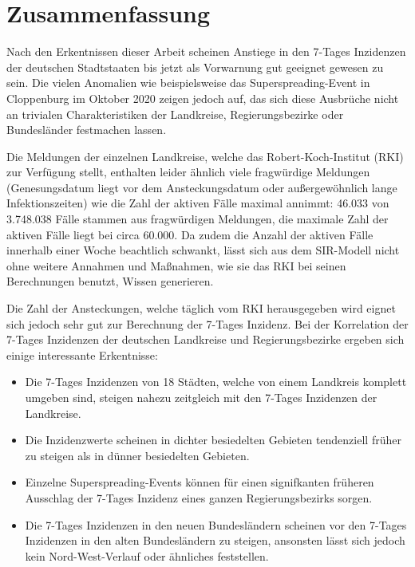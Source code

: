 \chapter{Zusammenfassung}\label{chap:Zusammenfassun}
Nach den Erkentnissen dieser Arbeit scheinen Anstiege in den 7-Tages Inzidenzen der deutschen Stadtstaaten bis jetzt als Vorwarnung gut geeignet gewesen zu sein. Die vielen Anomalien wie beispielsweise das Superspreading-Event in Cloppenburg im Oktober 2020 zeigen jedoch auf, das sich diese Ausbrüche nicht an trivialen Charakteristiken der Landkreise, Regierungsbezirke oder Bundesländer festmachen lassen.

Die Meldungen der einzelnen Landkreise, welche das Robert-Koch-Institut (RKI) zur Verfügung stellt, enthalten leider ähnlich viele fragwürdige Meldungen (Genesungsdatum liegt vor dem Ansteckungsdatum oder außergewöhnlich lange Infektionszeiten) wie die Zahl der aktiven Fälle maximal annimmt: 46.033 von 3.748.038 Fälle stammen aus fragwürdigen Meldungen, die maximale Zahl der aktiven Fälle liegt bei circa 60.000. Da zudem die Anzahl der aktiven Fälle innerhalb einer Woche beachtlich schwankt, lässt sich aus dem SIR-Modell nicht ohne weitere Annahmen und Maßnahmen, wie sie das RKI bei seinen Berechnungen benutzt, Wissen generieren.

Die Zahl der Ansteckungen, welche täglich vom RKI herausgegeben wird eignet sich jedoch sehr gut zur Berechnung der 7-Tages Inzidenz.
Bei der Korrelation der 7-Tages Inzidenzen der deutschen Landkreise und Regierungsbezirke ergeben sich einige interessante Erkentnisse:
\begin{itemize}
    \item Die 7-Tages Inzidenzen von 18 Städten, welche von einem Landkreis komplett umgeben sind, steigen nahezu zeitgleich mit den 7-Tages Inzidenzen der Landkreise.
    \item Die Inzidenzwerte scheinen in dichter besiedelten Gebieten tendenziell früher zu steigen als in dünner besiedelten Gebieten.
    \item Einzelne Superspreading-Events können für einen signifkanten früheren Ausschlag der 7-Tages Inzidenz eines ganzen Regierungsbezirks sorgen.
    \item Die 7-Tages Inzidenzen in den neuen Bundesländern scheinen vor den 7-Tages Inzidenzen in den alten Bundesländern zu steigen, ansonsten lässt sich jedoch kein Nord-West-Verlauf oder ähnliches feststellen.
\end{itemize}